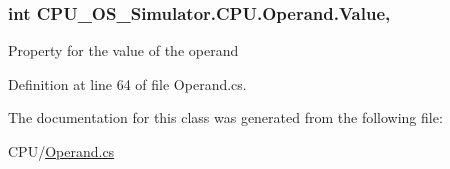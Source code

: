 \subsubsection[{Value}]{\setlength{\rightskip}{0pt plus 5cm}int C\+P\+U\+\_\+\+O\+S\+\_\+\+Simulator.\+C\+P\+U.\+Operand.\+Value\hspace{0.3cm}{\ttfamily [get]}, {\ttfamily [set]}}\label{class_c_p_u___o_s___simulator_1_1_c_p_u_1_1_operand_ab109292eba2094db4d7f21cbdbd5bc9e}


Property for the value of the operand 



Definition at line 64 of file Operand.\+cs.



The documentation for this class was generated from the following file\+:\begin{DoxyCompactItemize}
\item 
C\+P\+U/\hyperlink{_operand_8cs}{Operand.\+cs}\end{DoxyCompactItemize}
